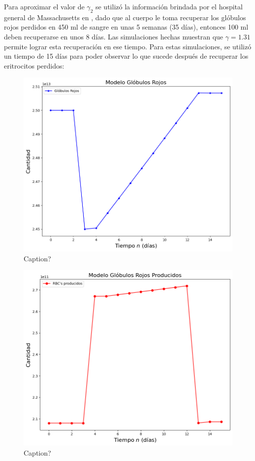 Para aproximar el valor de $\gamma_2$ se utilizó la información brindada por el hospital general de Massachusetts en \cite{Massachusetts}, dado que al cuerpo le toma recuperar los glóbulos rojos perdidos en 450 ml de sangre en unas 5 semanas (35 días), entonces 100 ml deben recuperarse en unos 8 días. Las simulaciones hechas muestran que $\gamma=1.31$ permite lograr esta recuperación en ese tiempo.
Para estas simulaciones, se utilizó un tiempo de 15 días para poder observar lo que sucede después de recuperar los eritrocitos perdidos:

\begin{figure}[H]
    \centering
    \includegraphics[scale=0.57]{figures/HemoLeveG13RBC.png}
    \caption{Caption?}
    \label{sec:variaciones:fig:HemoLeveG13RBC}
\end{figure}

\begin{figure}[H]
    \centering
    \includegraphics[scale=0.57]{figures/HemoLeveG13SC.png}
    \caption{Caption?}
    \label{sec:variaciones:fig:HemoLeveG13SC}
\end{figure}